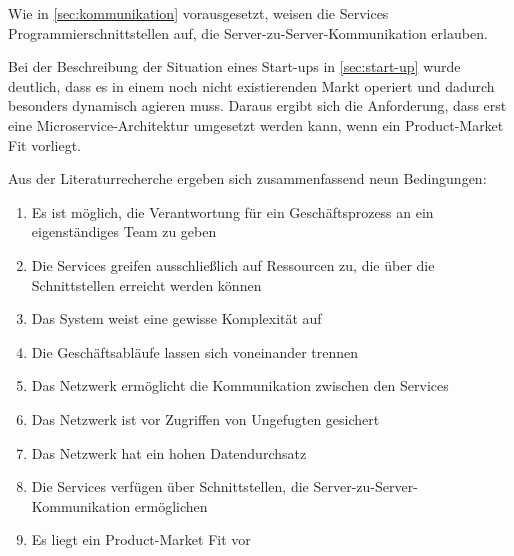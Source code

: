 Wie in \cref{sec:kommunikation} vorausgesetzt, weisen die Services Programmierschnittstellen auf, die Server-zu-Server-Kommunikation erlauben.

Bei der Beschreibung der Situation eines Start-ups in \cref{sec:start-up} wurde deutlich, dass es in einem noch nicht existierenden Markt operiert und dadurch besonders dynamisch agieren muss. Daraus ergibt sich die Anforderung, dass erst eine Microservice-Architektur umgesetzt werden kann, wenn ein Product-Market Fit vorliegt.

Aus der Literaturrecherche ergeben sich zusammenfassend neun Bedingungen:
\begin{enumerate}
	\item Es ist möglich, die Verantwortung für ein Geschäftsprozess an ein eigenständiges Team zu geben
	\item Die Services greifen ausschließlich auf Ressourcen zu, die über die Schnittstellen erreicht werden können
	\item Das System weist eine gewisse Komplexität auf
	\item Die Geschäftsabläufe lassen sich voneinander trennen
	\item Das Netzwerk ermöglicht die Kommunikation zwischen den Services
	\item Das Netzwerk ist vor Zugriffen von Ungefugten gesichert
	\item Das Netzwerk hat ein hohen Datendurchsatz
	\item Die Services verfügen über Schnittstellen, die Server-zu-Server-Kommunikation ermöglichen
	\item Es liegt ein Product-Market Fit vor
\end{enumerate}